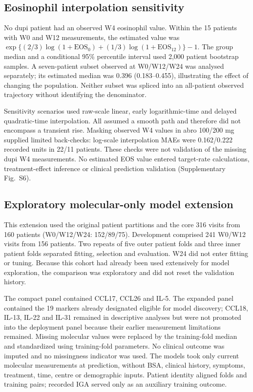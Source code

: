 \documentclass[10pt,a4paper]{article}
\begin{document}
\subsection*{Eosinophil interpolation sensitivity}
No dupi patient had an observed W4 eosinophil value. Within the 15 patients with W0 and W12 measurements, the estimated value was $\exp\{(2/3)\log(1+\mathrm{EOS}_0)+(1/3)\log(1+\mathrm{EOS}_{12})\}-1$. The group median and a conditional 95\% percentile interval used 2,000 patient bootstrap samples. A seven-patient subset observed at W0/W12/W24 was analysed separately; its estimated median was 0.396 (0.183--0.455), illustrating the effect of changing the population. Neither subset was spliced into an all-patient observed trajectory without identifying the denominator.

Sensitivity scenarios used raw-scale linear, early logarithmic-time and delayed quadratic-time interpolation. All assumed a smooth path and therefore did not encompass a transient rise. Masking observed W4 values in abro 100/200 mg supplied limited back-checks: log-scale interpolation MAEs were 0.162/0.222 recorded units in 22/11 patients. These checks were not validation of the missing dupi W4 measurements. No estimated EOS value entered target-rate calculations, treatment-effect inference or clinical prediction validation (Supplementary Fig.~S6).

\subsection*{Exploratory molecular-only model extension}
This extension used the original patient partitions and the core 316 visits from 160 patients (W0/W12/W24: 152/89/75). Development comprised 241 W0/W12 visits from 156 patients. Two repeats of five outer patient folds and three inner patient folds separated fitting, selection and evaluation. W24 did not enter fitting or tuning. Because this cohort had already been used extensively for model exploration, the comparison was exploratory and did not reset the validation history.

The compact panel contained CCL17, CCL26 and IL-5. The expanded panel contained the 19 markers already designated eligible for model discovery; CCL18, IL-13, IL-22 and IL-31 remained in descriptive analyses but were not promoted into the deployment panel because their earlier measurement limitations remained. Missing molecular values were replaced by the training-fold median and standardized using training-fold parameters. No clinical outcome was imputed and no missingness indicator was used. The models took only current molecular measurements at prediction, without BSA, clinical history, symptoms, treatment, time, centre or demographic inputs. Patient identity aligned folds and training pairs; recorded IGA served only as an auxiliary training outcome.
\end{document}
